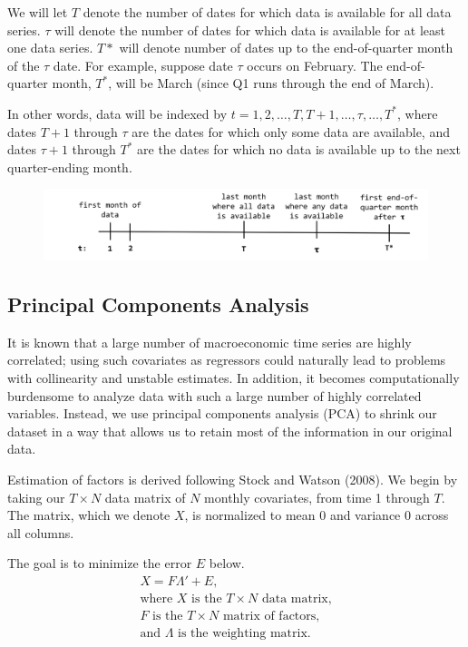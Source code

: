 \documentclass[11pt, letterpaper]{article}\usepackage[]{graphicx}\usepackage[]{color}
\begin{document}
We will let $T$ denote the number of dates for which data is available for all data series. $\tau$ will denote the number of dates for which data is available for at least one data series. $T*$ will denote number of dates up to the end-of-quarter month of the $\tau$ date. For example, suppose date $\tau$ occurs on February. The end-of-quarter month, $T^*$, will be March (since Q1 runs through the end of March). 

In other words, data will be indexed by $t = 1, 2, \dots, T, T+1, \dots, \tau, \dots, T^*$, where dates $T + 1$ through $\tau$ are the dates for which only some data are available, and dates $\tau + 1$ through $T^*$ are the dates for which no data is available up to the next quarter-ending month.
\begin{figure}[H]
\includegraphics[scale=.7]{nowcast-time}
\centering
\end{figure}



\subsection{Principal Components Analysis}
It is known that a large number of macroeconomic time series are highly correlated; using such covariates as regressors could naturally lead to problems with collinearity and unstable estimates. In addition, it becomes computationally burdensome to analyze data with such a large number of highly correlated variables. Instead, we use principal components analysis (PCA) to shrink our dataset in a way that allows us to retain most of the information in our original data.

Estimation of factors is derived following Stock and Watson (2008). We begin by taking our $T \times N$ data matrix of $N$ monthly covariates, from time 1 through $T$. The matrix, which we denote $X$, is normalized to mean 0 and variance 0 across all columns.

The goal is to minimize the error $E$ below.
\begin{align*}
	X = F  \Lambda ' + E,\\
	\text{where $X$ is the $T \times N$ data matrix,}\\
	\text{$F$ is the $T \times N$ matrix of factors,}\\
	\text{and $\Lambda$ is the weighting matrix.}\\
\end{align*}
\end{document}
